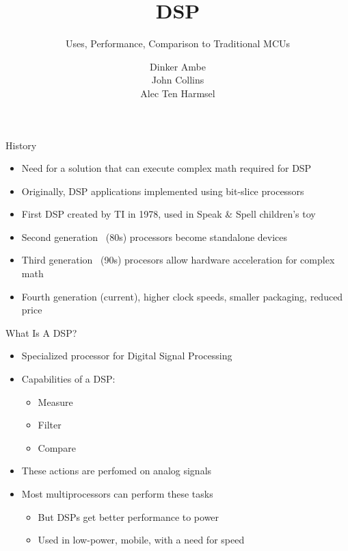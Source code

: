 \documentclass{beamer}
\begin{document}
\beamertemplatenavigationsymbolsempty

\title{DSP}
\subtitle{Uses, Performance, Comparison to Traditional MCUs}
\author{Dinker Ambe\\
John Collins\\
Alec Ten Harmsel}


\frame{\titlepage}

\begin{frame}{History}
    \begin{itemize}
        \item Need for a solution that can execute complex math required for DSP
        \item Originally, DSP applications implemented using bit-slice processors
        \item First DSP created by TI in 1978, used in Speak \& Spell children's toy
        \item Second generation ~(80s) processors become standalone devices
        \item Third generation ~(90s) procesors allow hardware acceleration for complex math
        \item Fourth generation (current), higher clock speeds, smaller packaging, reduced price
    \end{itemize}
\end{frame}

\begin{frame}{What Is A DSP?}
    \begin{itemize}
        \item Specialized processor for Digital Signal Processing
        \item Capabilities of a DSP:
            \begin{itemize}
                \item Measure
                \item Filter
                \item Compare
            \end{itemize}
        \item These actions are perfomed on analog signals
        \item Most multiprocessors can perform these tasks
            \begin{itemize}
                \item But DSPs get better performance to power 
                \item Used in low-power, mobile, with a need for speed 
            \end{itemize}
     \end{itemize}
\end{frame}
\end{document}

